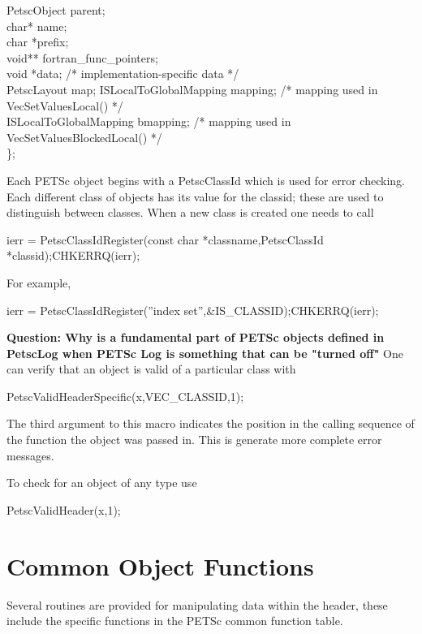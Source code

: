 \documentclass[twoside,12pt]{../sty/report_petsc}
\begin{document}
\begin{tabbing}
  PetscObject            parent;                                  \\
  char*                  name;                                    \\
  char                   *prefix;                                 \\
  void**                 fortran\_func\_pointers;       \\
  void                   *data;     /* implementation-specific data */\\
  PetscLayout            map;
  ISLocalToGlobalMapping mapping;   /* mapping used in VecSetValuesLocal() */\\
  ISLocalToGlobalMapping bmapping;  /* mapping used in VecSetValuesBlockedLocal() */\\
\};
\end{tabbing}

Each PETSc object begins with a PetscClassId which is used for error checking.
Each different class of objects has its value for the classid; these are used
to distinguish between classes. When a new class is created one needs to call
\begin{tabbing}
  ierr = PetscClassIdRegister(const char *classname,PetscClassId *classid);CHKERRQ(ierr);
\end{tabbing}
For example,
\begin{tabbing}
  ierr = PetscClassIdRegister(''index set'',\&IS\_CLASSID);CHKERRQ(ierr);
\end{tabbing}
{\bf Question: Why is a fundamental part of PETSc objects defined in PetscLog when PETSc Log
is something that can be "turned off"} One can verify that an object is valid of a particular
class with
\begin{tabbing}
  PetscValidHeaderSpecific(x,VEC\_CLASSID,1);
\end{tabbing}
The third argument to this macro indicates the position in the calling sequence of the
function the object was passed in. This is generate more complete error messages.

To check for an object of any type use
\begin{tabbing}
  PetscValidHeader(x,1);
\end{tabbing}

\section{Common Object Functions}

Several routines are provided for manipulating data within the header, these include the specific functions in the PETSc common function table.
\end{document}
